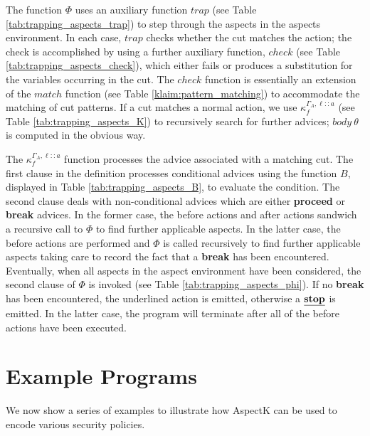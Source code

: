 \documentclass[a4paper]{llncs}
\begin{document}





The function $\Phi$ uses an auxiliary function ${trap}$ 
(see Table \ref{tab:trapping_aspects_trap}) to step through
the aspects in the aspects environment.  In each case, ${trap}$ checks whether
the cut matches the action; the check is accomplished by using a further auxiliary
function, ${check}$ (see Table \ref{tab:trapping_aspects_check}), 
which either fails or produces a substitution for the 
variables occurring in the cut.
The ${check}$ function is essentially an extension of the ${match}$
function (see Table \ref{klaim:pattern_matching}) to accommodate the matching
of cut patterns.
If a cut matches a normal action, we use $\kappa_f^{\Gamma_A,\ell :: a}$
(see Table \ref{tab:trapping_aspects_K}) to recursively
search for further advices; $body \ \theta$ is computed in the obvious
way.



The $\kappa_f^{\Gamma_A,\ell :: a}$ function processes the advice associated with a 
matching cut.  The first clause in the definition processes conditional advices
using the function $B$, displayed in Table
\ref{tab:trapping_aspects_B}, to evaluate the condition. 
The second clause deals with non-conditional advices which are either {\bf proceed} or
{\bf break} advices.  In the former case, the before actions and after actions 
sandwich a recursive call to $\Phi$ to find further applicable aspects.  In the
latter case, the before actions are performed and $\Phi$ is called recursively
to find further applicable aspects taking care to record the fact that a {\bf break}
has been encountered.  Eventually, when all aspects in the aspect environment
have been considered, the second clause of $\Phi$ is invoked (see Table
\ref{tab:trapping_aspects_phi}).  If no {\bf break}
has been encountered, the underlined action is emitted, otherwise a 
$\underline{\bf stop}$ is emitted.  In the latter case, the program will terminate
after all of the before actions have been executed.

\section{Example Programs}

We now show a series of examples to illustrate how AspectK can be used to encode various security policies.

\newcommand{\DBpub}{{\sf YP}}
\newcommand{\DBsec}{{\sf DB}}
\end{document}
